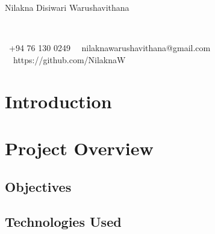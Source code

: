 \documentclass[11pt]{article}
\title{}
\author{}
\begin{document}

\begin{center}
\begin{Huge}
Nilakna Disiwari Warushavithana
\end{Huge}\\

\begin{small}
\vspace{11pt}
\phone \ +94 76 130 0249 \ \faEnvelope \ nilaknawarushavithana@gmail.com \ \faGithub \ https://github.com/NilaknaW 
\end{small}
\end{center}

\section{Introduction}

\section{Project Overview}

\subsection{Objectives}

\subsection{Technologies Used}
\end{document}
